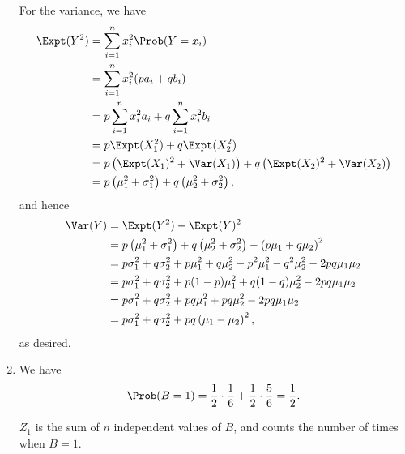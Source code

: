 \begin{enumerate}
          For the variance, we have
          \begin{align*}
              \Expt(Y^2) & = \sum_{i = 1}^{n} x_i^2 \Prob(Y = x_i)                                             \\
                         & = \sum_{i = 1}^{n} x_i^2 (p a_i + q b_i)                                            \\
                         & = p \sum_{i = 1}^{n} x_i^2 a_i + q \sum_{i = 1}^{n} x_i^2 b_i                       \\
                         & = p \Expt(X_1^2) + q \Expt(X_2^2)                                                   \\
                         & = p \left(\Expt(X_1)^2 + \Var(X_1)\right) + q \left(\Expt(X_2)^2 + \Var(X_2)\right) \\
                         & = p \left(\mu_1^2 + \sigma_1^2\right) + q \left(\mu_2^2 + \sigma_2^2\right),
          \end{align*}
          and hence
          \begin{align*}
              \Var(Y) & = \Expt(Y^2) - \Expt(Y)^2                                                                                      \\
                      & = p \left(\mu_1^2 + \sigma_1^2\right) + q \left(\mu_2^2 + \sigma_2^2\right) - \left(p \mu_1 + q \mu_2\right)^2 \\
                      & = p \sigma_1^2 + q \sigma_2^2 + p \mu_1^2 + q \mu_2^2 - p^2 \mu_1^2 - q^2 \mu_2^2 - 2pq \mu_1 \mu_2            \\
                      & = p \sigma_1^2 + q \sigma_2^2 + p (1 - p) \mu_1^2 + q (1 - q) \mu_2^2 - 2pq \mu_1 \mu_2                        \\
                      & = p \sigma_1^2 + q \sigma_2^2 + pq \mu_1^2 + pq \mu_2^2 - 2pq \mu_1 \mu_2                                      \\
                      & = p \sigma_1^2 + q \sigma_2^2 + pq \left(\mu_1 - \mu_2\right)^2,
          \end{align*}
          as desired.

    \item We have
          \[
              \Prob(B = 1) = \frac{1}{2} \cdot \frac{1}{6} + \frac{1}{2} \cdot \frac{5}{6} = \frac{1}{2}.
          \]

          \(Z_1\) is the sum of \(n\) independent values of \(B\), and counts the number of times when \(B = 1\).


\end{enumerate}
